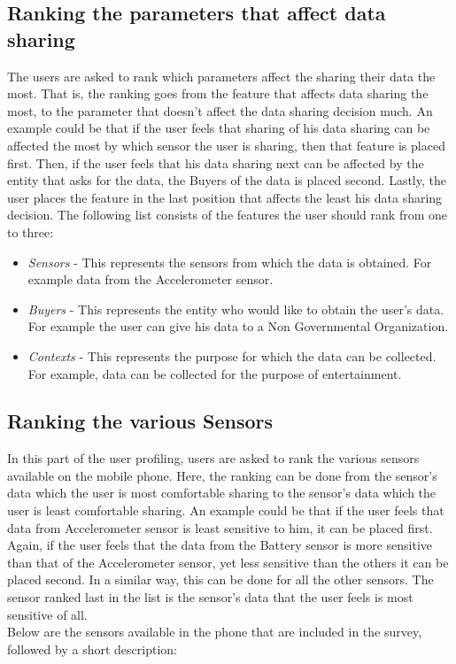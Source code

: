 
\subsection{Ranking the parameters that affect data sharing}     \label{ranking_questions}

The users are asked to rank which parameters affect the sharing their data the most. That is,
the ranking goes from the feature that affects data sharing the most, to the parameter that doesn't affect the data sharing decision much. An example could be that if the user feels that sharing of his data sharing can be affected the most by which sensor the user is sharing, then that feature
is placed first. Then, if the user feels that his data sharing next can be affected by the entity that asks for the data, the Buyers of the data is placed second. Lastly, the user places the feature in the last position that affects the least his data sharing decision.
The following list consists of the features the user should rank from one to three:


\begin{itemize}
\item {\it Sensors} - This represents the sensors from which the data is obtained. For example data from the Accelerometer sensor.
\item {\it Buyers} - This represents the entity who would like to obtain the user's data. For example the user can give his data to a Non Governmental Organization.
\item {\it Contexts} - This represents the purpose for which the data can be collected. For example, data can be collected for the purpose of
entertainment.
\end{itemize}



\subsection{Ranking the various Sensors}

In this part of the user profiling, users are asked to rank the various sensors available on the mobile phone. Here, the ranking can be done from the sensor's data which the user is most comfortable sharing to the sensor's data which the user is least comfortable sharing. An example could be that 
if the user feels that data from Accelerometer sensor is least sensitive to him, it can be placed first. Again, if the user feels that the data from the Battery sensor is more sensitive than that of the Accelerometer sensor, yet less sensitive than the others it can be placed second. In a similar way, this can be done for all the other sensors. The sensor ranked last in the list is the sensor's data that the user feels is most sensitive of all.\\
Below are the sensors available in the phone that are included in the survey, followed by a short description:

